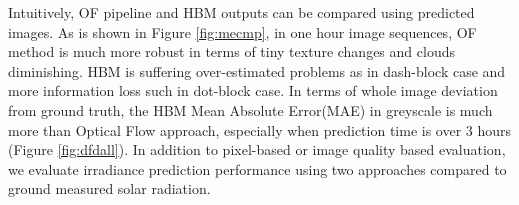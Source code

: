 \documentclass[conference]{IEEEtran}
\begin{document}



Intuitively, OF pipeline and HBM outputs can be compared using predicted
images.
As is shown in Figure \ref{fig:mecmp}, in one hour image sequences, OF method
is much more robust in terms of tiny texture changes and clouds diminishing. 
HBM is suffering over-estimated problems as in dash-block case and more information
loss such in dot-block case. In terms of whole image deviation from ground
truth, the HBM Mean Absolute Error(MAE) in greyscale is much more than Optical
Flow approach, especially when prediction time is over 3 hours (Figure
\ref{fig:dfdall}).
In addition to pixel-based or image quality based evaluation, we evaluate irradiance prediction 
performance using two approaches compared to ground measured solar radiation. 

\end{document}
